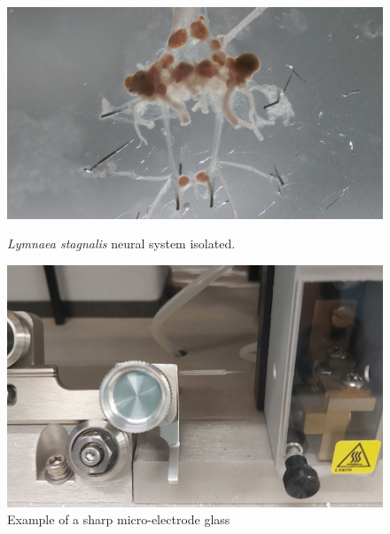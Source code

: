 \begin{figure}[hbt!]
	\centering
	\begin{minipage}{0.4\textwidth}
		\centering
		\includegraphics[angle=180,width=0.99\linewidth]{img/methods/IMG00027.jpg}
		\caption{\textit{Lymnaea stagnalis} neural system isolated.}
		\label{fig:preparation}
	\end{minipage}
	\hfill
	\centering
	\begin{minipage}{0.4\textwidth}
		\centering
		\includegraphics[width=0.99\linewidth]{img/methods/preparation/electrode4_zoom.jpg}
		\caption{Example of a sharp micro-electrode glass}
		\label{fig:electrode}
	\end{minipage}
\end{figure}


